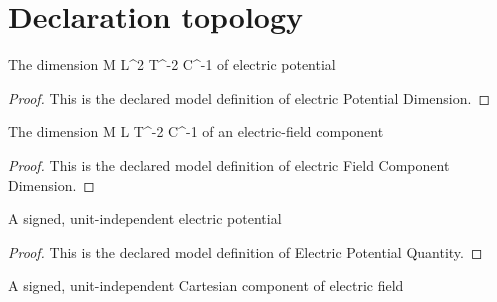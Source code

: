 \section{Declaration topology}
\begin{definition}
  \label{def:physics:phyx-mini-0869:phyxminiproblems-problemphyxmini0869-electricpotentialdimension}
  The dimension M L\textasciicircum{}2 T\textasciicircum{}-2 C\textasciicircum{}-1 of electric potential
\end{definition}
\begin{proof}
  This is the declared model definition of electric Potential Dimension.
\end{proof}
\begin{definition}
  \label{def:physics:phyx-mini-0869:phyxminiproblems-problemphyxmini0869-electricfieldcomponentdimension}
  The dimension M L T\textasciicircum{}-2 C\textasciicircum{}-1 of an electric-field component
\end{definition}
\begin{proof}
  This is the declared model definition of electric Field Component Dimension.
\end{proof}
\begin{definition}
  \label{def:physics:phyx-mini-0869:phyxminiproblems-problemphyxmini0869-electricpotentialquantity}
  A signed, unit-independent electric potential
\end{definition}
\begin{proof}
  This is the declared model definition of Electric Potential Quantity.
\end{proof}
\begin{definition}
  \label{def:physics:phyx-mini-0869:phyxminiproblems-problemphyxmini0869-signedelectricfieldcomponentquantity}
  A signed, unit-independent Cartesian component of electric field
\end{definition}
